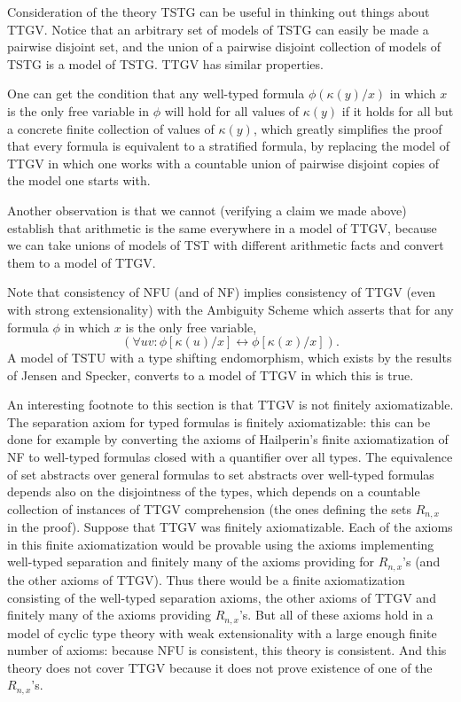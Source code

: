 \documentclass[12pt]{article}
\begin{document}
Consideration of the theory TSTG can be useful in thinking out things about TTGV.  Notice that
an arbitrary set of models of TSTG can easily be made a pairwise disjoint set, and the union of a pairwise disjoint collection of models of TSTG is a model of TSTG.  TTGV has similar properties.

One can get the condition that any well-typed formula $\phi(\kappa(y)/x)$ in which $x$ is the only free variable in $\phi$
will hold for all values of $\kappa(y)$ if it holds for all but a concrete finite collection of values of $\kappa(y)$, which greatly simplifies the proof that every formula is equivalent to a stratified formula, by replacing  the model of TTGV in which one works with a countable union of pairwise disjoint copies of the model one starts with.

Another observation is that we cannot (verifying a claim we made above) establish that arithmetic is the same everywhere in a model of TTGV, because we can take unions of models of TST with different arithmetic facts and convert them to a model of TTGV.

Note that consistency of NFU (and of NF) implies consistency of TTGV (even with strong extensionality) with the Ambiguity Scheme which asserts that for any  formula $\phi$ in which $x$ is the only free variable, $$(\forall uv:\phi[\kappa(u)/x]\leftrightarrow \phi[\kappa(x)/x]).$$  A model of TSTU with a type shifting endomorphism, which exists by the results of Jensen and Specker, converts to a model of TTGV in which this is true.

An interesting footnote to this section is that TTGV is not finitely axiomatizable.  The separation axiom for typed formulas is finitely axiomatizable:  this can be done for example by converting the axioms of Hailperin's finite axiomatization of NF to well-typed formulas closed with a quantifier over all types.  The equivalence of set abstracts over general formulas to set abstracts over well-typed formulas depends also on the disjointness of the types, which depends on a countable collection
of instances of TTGV comprehension (the ones defining the sets $R_{n,x}$ in the proof).  Suppose that TTGV was finitely axiomatizable.  Each of the axioms in this finite axiomatization would be provable using the axioms implementing well-typed separation and finitely many of the axioms providing for $R_{n,x}$'s (and the other axioms of TTGV).  Thus there would be a finite axiomatization consisting of the well-typed separation axioms, the other axioms of TTGV and finitely many of the axioms providing $R_{n,x}$'s.  But all of these axioms hold in a model of cyclic type theory with weak extensionality with a large enough finite number of axioms:  because NFU is consistent, this theory is consistent.  And this theory does not cover TTGV because it does not prove existence of one of the $R_{n,x}$'s.
\end{document}
